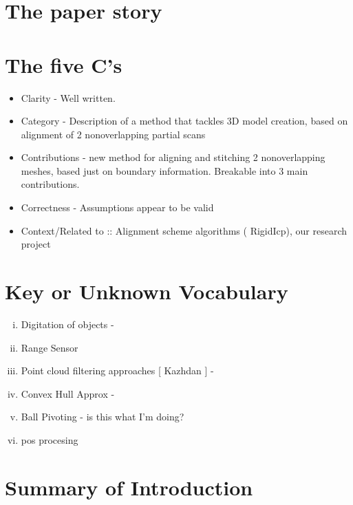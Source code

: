 \documentclass{article}
\begin{document}
\section{The paper story}

\section{The five C's}
\begin{itemize}
	\item Clarity - Well written.
	\item Category - Description of a method that tackles 3D model creation, based on alignment of 2 nonoverlapping partial scans
	\item Contributions - new method for aligning and stitching 2 nonoverlapping meshes, based just on boundary information. Breakable into 3 main contributions.
	\item Correctness - Assumptions appear to be valid
	\item Context/Related to :: Alignment scheme algorithms ( RigidIcp), our research project
\end{itemize}

\section{Key or Unknown Vocabulary}
\begin{enumerate}[(i)]
	\item Digitation of objects -
	\item Range Sensor
	\item Point cloud filtering approaches [ Kazhdan ] - 
	\item Convex Hull Approx - 
	\item Ball Pivoting - is this what I'm doing? 
	\item pos procesing
\end{enumerate}

\section{Summary of Introduction}
\end{document}
